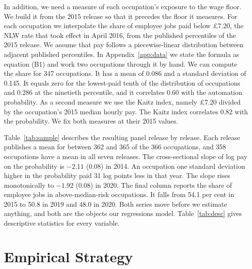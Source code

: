 \documentclass[12pt,leqno]{article}
\begin{document}
In addition, we need a measure of each occupation's exposure to the wage floor. We build it from the 2015 release so that it precedes the floor it measures. For each occupation we interpolate the share of employee jobs paid below \pounds 7.20, the NLW rate that took effect in April 2016, from the published percentiles of the 2015 release. We assume that pay follows a piecewise-linear distribution between adjacent published percentiles. In Appendix~\ref{app:data} we state the formula as equation (B1) and work two occupations through it by hand. We can compute the share for 347 occupations. It has a mean of 0.086 and a standard deviation of 0.145. It equals zero for the lowest-paid tenth of the distribution of occupations and 0.286 at the ninetieth percentile, and it correlates 0.60 with the automation probability. As a second measure we use the Kaitz index, namely \pounds 7.20 divided by the occupation's 2015 median hourly pay. The Kaitz index correlates 0.82 with the probability. We fix both measures at their 2015 values.

Table~\ref{tab:sample} describes the resulting panel release by release. Each release publishes a mean for between 362 and 365 of the 366 occupations, and 358 occupations have a mean in all seven releases. The cross-sectional slope of log pay on the probability is $-2.11$ (0.08) in 2014. An occupation one standard deviation higher in the probability paid 31 log points less in that year. The slope rises monotonically to $-1.92$ (0.08) in 2020. The final column reports the share of employee jobs in above-median-risk occupations. It falls from 54.1 per cent in 2015 to 50.8 in 2019 and 48.0 in 2020. Both series move before we estimate anything, and both are the objects our regressions model. Table~\ref{tab:desc} gives descriptive statistics for every variable.



\section{Empirical Strategy}\label{sec:strategy}
\end{document}
